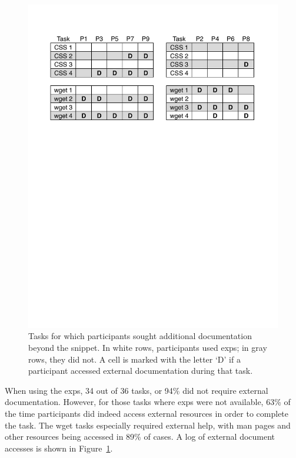 \begin{figure}
\centering
\includegraphics[width=\columnwidth]{figures/doc_accesses}
\caption{%
Tasks for which participants sought additional documentation beyond the snippet. In white rows, participants used \glspl{exp}; in gray rows, they did not.
A cell is marked with the letter `D' if a participant accessed external documentation during that task.
}
\label{fig:doc_accesses}
\end{figure}

When using the \glspl{exp}, 34 out of 36 tasks, or 94\% did not require external documentation.  However, for those tasks where \glspl{exp} were not available, 63\% of the time participants did indeed access external resources in order to complete the task.  The wget tasks especially required external help, with man pages and other resources being accessed in 89\% of cases.  
A log of external document accesses is shown in Figure~\ref{fig:doc_accesses}. 



